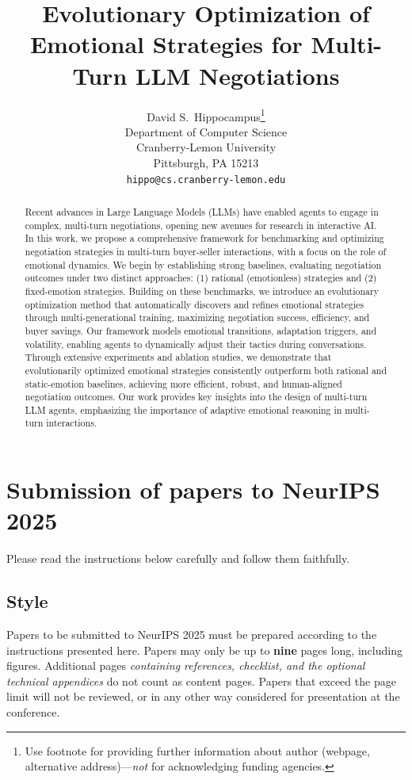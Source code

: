 \documentclass{article}
\title{Evolutionary Optimization of Emotional Strategies for Multi-Turn LLM Negotiations}
\author{%
  David S.~Hippocampus\thanks{Use footnote for providing further information
    about author (webpage, alternative address)---\emph{not} for acknowledging
    funding agencies.} \\
  Department of Computer Science\\
  Cranberry-Lemon University\\
  Pittsburgh, PA 15213 \\
  \texttt{hippo@cs.cranberry-lemon.edu} \\
}
\begin{document}
\maketitle


\begin{abstract}
Recent advances in Large Language Models (LLMs) have enabled agents to engage in complex, multi-turn negotiations, opening new avenues for research in interactive AI. In this work, we propose a comprehensive framework for benchmarking and optimizing negotiation strategies in multi-turn buyer-seller interactions, with a focus on the role of emotional dynamics.
We begin by establishing strong baselines, evaluating negotiation outcomes under two distinct approaches: (1) rational (emotionless) strategies and (2) fixed-emotion strategies. Building on these benchmarks, we introduce an evolutionary optimization method that automatically discovers and refines emotional strategies through multi-generational training, maximizing negotiation success, efficiency, and buyer savings. Our framework models emotional transitions, adaptation triggers, and volatility, enabling agents to dynamically adjust their tactics during conversations.
Through extensive experiments and ablation studies, we demonstrate that evolutionarily optimized emotional strategies consistently outperform both rational and static-emotion baselines, achieving more efficient, robust, and human-aligned negotiation outcomes. Our work provides key insights into the design of multi-turn LLM agents, emphasizing the importance of adaptive emotional reasoning in multi-turn interactions.
\end{abstract}


\section{Submission of papers to NeurIPS 2025}


Please read the instructions below carefully and follow them faithfully.


\subsection{Style}


Papers to be submitted to NeurIPS 2025 must be prepared according to the
instructions presented here. Papers may only be up to {\bf nine} pages long,
including figures.
Additional pages \emph{containing references, checklist, and the optional technical appendices} do not count as content pages.
Papers that exceed the page limit will not be
reviewed, or in any other way considered for presentation at the conference.
\end{document}
